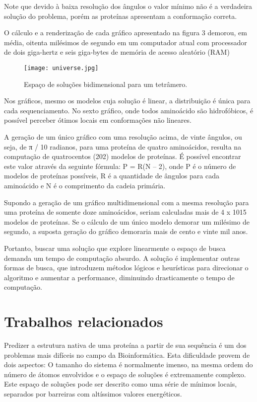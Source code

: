 \documentclass[dm,ppgcomp]{texfurg}
\begin{document}
Note que devido à baixa resolução dos ângulos o valor mínimo não é a verdadeira
solução do problema, porém as proteínas apresentam a conformação correta.

O cálculo e a renderização de cada gráfico apresentado na figura 3 demorou, em média,
oitenta milésimos de segundo em um computador atual com processador de dois giga-hertz e
seis giga-bytes de memória de acesso aleatório (RAM)

\begin{figure}[htbp]
  \centering \texttt{[image: universe.jpg]}
\caption{Espaço de soluções bidimensional para um tetrâmero.} 
\label{figura3}
\end{figure}

Nos gráficos, mesmo os modelos cuja solução é linear, a distribuição é única para cada sequenciamento. No sexto gráfico, onde todos aminoácido são hidrofóbicos, é possível perceber ótimos locais em conformações não lineares.

A geração de um único gráfico com uma resolução acima, de vinte ângulos, ou seja, de π / 10 radianos, para uma proteína de quatro aminoácidos, resulta na computação de quatrocentos (202) modelos de proteínas. É possível encontrar este valor através da seguinte  fórmula: P = R(N – 2), onde P é o número de modelos de proteínas possíveis, R é a quantidade de ângulos para cada aminoácido e N é o comprimento da cadeia primária. 

Supondo a geração de um gráfico multidimensional com a mesma resolução para uma proteína de somente doze aminoácidos, seriam calculadas mais de 4 x 1015 modelos de proteínas. Se o cálculo de um único modelo demorar um milésimo de segundo, a suposta geração do gráfico demoraria mais de cento e vinte mil anos. 

Portanto, buscar uma solução que explore linearmente o espaço de busca demanda um tempo de computação absurdo. A solução é implementar outras formas de busca, que introduzem métodos lógicos e heurísticas para direcionar o algoritmo e aumentar a performance, diminuindo drasticamente o tempo de computação.

\chapter{Trabalhos relacionados}

Predizer a estrutura nativa de uma proteína a partir de sua sequência é um dos problemas mais difíceis no campo da Bioinformática. Esta dificuldade provem de dois aspectos: O tamanho do sistema é normalmente imenso, na mesma ordem do número de átomos envolvidos e o espaço de soluções é extremamente complexo. Este espaço de soluções pode ser descrito como uma série de mínimos locais, separados por barreiras com altíssimos valores energéticos.
\end{document}
